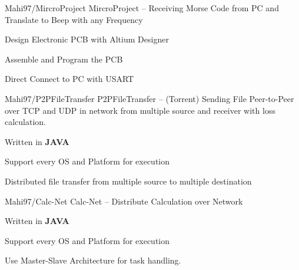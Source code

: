 \begin{cventries}
    \cventry
    {Mahi97/MircroProject} %
    {MircroProject -- Receiving Morse Code from PC and Translate to Beep with any Frequency} %
    {} %
    {} %
    {
      \begin{cvitems} %
        \item {Design Electronic PCB with Altium Designer}
        \item {Assemble and Program the PCB}
        \item {Direct Connect to PC with USART}
      \end{cvitems}
    }

    \cventry
    {Mahi97/P2PFileTransfer} %
    {P2PFileTransfer -- (Torrent) Sending File Peer-to-Peer over TCP and UDP in network from multiple source and receiver with loss calculation.} %
    {} %
    {} %
    {
      \begin{cvitems} %
        \item {Written in \textbf{JAVA}}
        \item {Support every OS and Platform for execution}
        \item {Distributed file transfer from multiple source to multiple destination}
      \end{cvitems}
    }

    
    \cventry
    {Mahi97/Calc-Net} %
    {Calc-Net -- Distribute Calculation over Network} %
    {} %
    {} %
    {
      \begin{cvitems} %
         \item {Written in \textbf{JAVA}}
        \item {Support every OS and Platform for execution}
        \item {Use Master-Slave Architecture for task handling.}
      \end{cvitems}
    }






\end{cventries}
